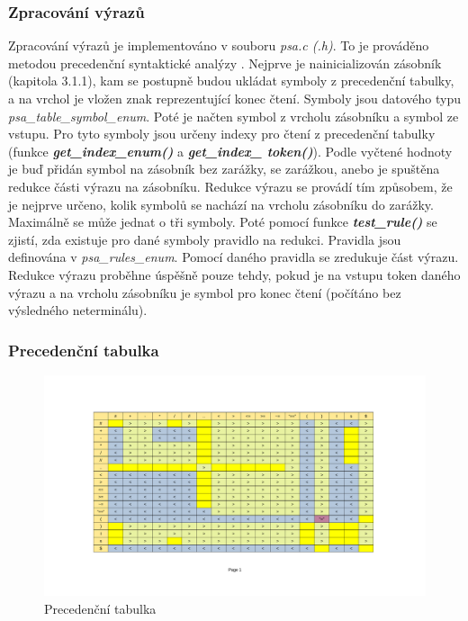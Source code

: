 \documentclass[a4paper, 12pt]{article}
\begin{document}
\newpage

\subsubsection{Zpracování výrazů}
Zpracování výrazů je implementováno v souboru \textit{psa.c (.h)}. To je prováděno metodou precedenční syntaktické analýzy \cite{FITPUB8538}. Nejprve je nainicializován zásobník (kapitola 3.1.1), kam se postupně budou ukládat symboly z precedenční tabulky, a na vrchol je vložen znak reprezentující konec čtení. Symboly jsou datového typu \textit{psa\_table\_symbol\_enum}. Poté je načten symbol z vrcholu zásobníku a symbol ze vstupu. Pro tyto symboly jsou určeny indexy pro čtení z precedenční tabulky (funkce \textit{\textbf{get\_index\_enum()}} a \textit{\textbf{get\_index\_ token()}}). Podle vyčtené hodnoty je buď přidán symbol na zásobník bez zarážky, se zarážkou, anebo je spuštěna redukce části výrazu na zásobníku. Redukce výrazu se provádí tím způsobem, že je nejprve určeno, kolik symbolů se nachází na vrcholu zásobníku do zarážky. Maximálně se může jednat o tři symboly. Poté pomocí funkce \textit{\textbf{test\_rule()}} se zjistí, zda existuje pro dané symboly pravidlo na redukci. Pravidla jsou definována v \textit{psa\_rules\_enum}. Pomocí daného pravidla se zredukuje část výrazu. Redukce výrazu proběhne úspěšně pouze tehdy, pokud je na vstupu token daného výrazu a na vrcholu zásobníku je symbol pro konec čtení (počítáno bez výsledného neterminálu).

\subsubsection{Precedenční tabulka}
\begin{figure}[ht!]
\begin{center}
  \includegraphics[width=1\textwidth, trim={0 2.5cm 0 0},clip]{images/precedence_table.pdf}
  \caption{Precedenční tabulka}
\end{center}
\end{figure}
\end{document}
